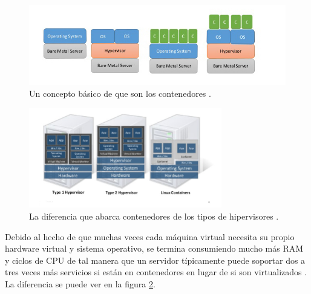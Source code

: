 \begin{figure}
  \begin{center}
      \includegraphics[width=\textwidth]{Figures/que-son-contenedores.jpg}
  \end{center}
  \caption{Un concepto básico de que son los contenedores \citep{Teimouri-Davoud-OS-level-virt}.}
  \label{que-son-contenedores}
\end{figure}

\begin{figure}
  \begin{center}
      \includegraphics[width=0.75\textwidth]{Figures/differencia-hipervisores-contenedores.png}
  \end{center}
  \caption{La diferencia que abarca contenedores de los tipos de hipervisores \citep{Teimouri-Davoud-OS-level-virt}.}
  \label{differencia-hipervisores-contenedores}
\end{figure}

 
Debido al hecho de que muchas veces cada máquina virtual necesita su propio hardware virtual y sistema operativo, se termina consumiendo mucho más RAM y ciclos de CPU de tal manera que un servidor típicamente puede soportar dos a tres veces más servicios si están en contenedores en lugar de si son virtualizados \citep{Teimouri-Davoud-OS-level-virt}. La diferencia se puede ver en la figura \ref{differencia-hipervisores-contenedores}.
 

